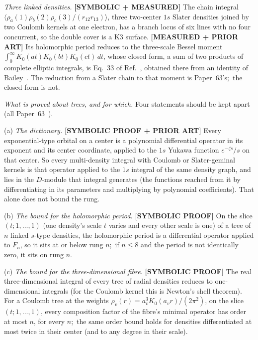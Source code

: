 \documentclass[aps,pra,twocolumn,superscriptaddress,longbibliography]{revtex4-2}
\begin{document}
\emph{Three linked densities.}  \textbf{[SYMBOLIC + MEASURED]} The chain
integral $\langle\rho_a(1)\rho_b(2)\rho_c(3)/(r_{12}r_{13})\rangle$, three
two-center $1s$ Slater densities joined by two Coulomb kernels at one
electron, has a branch locus of six lines with no four concurrent, so the
double cover is a K3 surface.  \textbf{[MEASURED + PRIOR ART]} Its
holomorphic period reduces to the three-scale Bessel moment
$\int_0^\infty K_0(at)K_0(bt)K_0(ct)\,dt$, whose closed form, a sum of
two products of complete elliptic integrals, is Eq.~33 of
Ref.~\cite{bbbg2008}, obtained there from an identity of
Bailey~\cite{bailey1936}.  The reduction from a Slater chain to that
moment is Paper~63's;\ the closed form is not.

\emph{What is proved about trees, and for which.}  Four statements
should be kept apart (all Paper~63~\cite{loutey_paper63}).

(a) \emph{The dictionary.}  \textbf{[SYMBOLIC PROOF + PRIOR ART]} Every
exponential-type orbital on a center is a polynomial differential
operator in its exponent and its center coordinate, applied to the $1s$
Yukawa function $e^{-\zeta s}/s$ on that center.  So every multi-density
integral with Coulomb or Slater-geminal kernels is that operator applied
to the $1s$ integral of the same density graph, and lies in the
$D$-module that integral generates (the functions reached from it by differentiating in its parameters and
multiplying by polynomial coefficients).  That alone does not bound the rung.

(b) \emph{The bound for the holomorphic period.}  \textbf{[SYMBOLIC
PROOF]} On the slice $(t;1,\dots,1)$ (one density's scale $t$ varies and
every other scale is one) of a tree of $n$ linked $s$-type densities, the holomorphic period is a differential operator applied to
$F_n$, so it sits at or below rung $n$;\ if $n\le8$ and the period is not
identically zero, it sits on rung $n$.

(c) \emph{The bound for the three-dimensional fibre.}  \textbf{[SYMBOLIC
PROOF]} The real three-dimensional integral of every tree of radial
densities reduces to one-dimensional integrals (for the Coulomb kernel
this is Newton's shell theorem).  For a Coulomb tree at the weights
$\rho_v(r)=a_v^3K_0(a_vr)/(2\pi^2)$, on the slice $(t;1,\dots,1)$, every
composition factor of the fibre's minimal operator has order at most
$n$, for every $n$;\ the same order bound holds for densities
differentiated at most twice in their center (and to any degree in their
scale).
\end{document}
